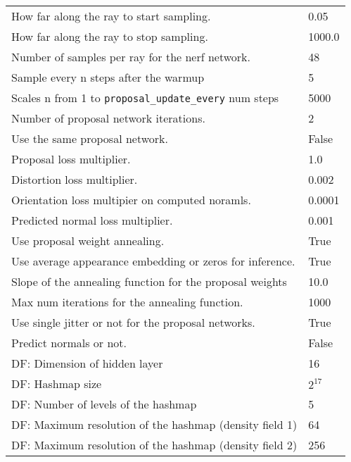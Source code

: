 \begin{longtable}{|l|l|}
How far along the ray to start sampling.                & 0.05 \\
How far along the ray to stop sampling.                 & 1000.0 \\
Number of samples per ray for the nerf network.         & 48 \\
Sample every n steps after the warmup                   & 5 \\
Scales n from 1 to \texttt{proposal\_update\_every} num steps & 5000 \\
Number of proposal network iterations.                  & 2 \\
Use the same proposal network. & False \\
Proposal loss multiplier.                               & 1.0 \\
Distortion loss multiplier.                             & 0.002 \\
Orientation loss multipier on computed noramls.         & 0.0001 \\
Predicted normal loss multiplier.                       & 0.001 \\
Use proposal weight annealing.               & True \\
Use average appearance embedding or zeros for inference. & True \\
Slope of the annealing function for the proposal weights & 10.0 \\
Max num iterations for the annealing function.          & 1000 \\
Use single jitter or not for the proposal networks. & True \\
Predict normals or not.                      & False \\
DF: Dimension of hidden layer           & 16 \\
DF: Hashmap size                        & $2^{17}$ \\
DF: Number of levels of the hashmap     & 5 \\
DF: Maximum resolution of the hashmap (density field 1)         & 64 \\
DF: Maximum resolution of the hashmap (density field 2)         & 256 \\
\end{longtable}



